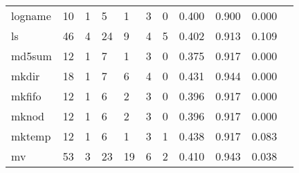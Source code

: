 \begin{longtable}{lp{1.10cm}p{1.10cm}p{1.10cm}p{1.10cm}p{1.10cm}p{1.10cm}p{1.10cm}p{1.10cm}p{1.10cm}p{1.10cm}}
logname   &                     10 &                                  1 &                                 5 &                                1 &                                 3 &                               0 &                          0.400 &                                 0.900 &                               0.000 \\
ls        &                     46 &                                  4 &                                24 &                                9 &                                 4 &                               5 &                          0.402 &                                 0.913 &                               0.109 \\
md5sum    &                     12 &                                  1 &                                 7 &                                1 &                                 3 &                               0 &                          0.375 &                                 0.917 &                               0.000 \\
mkdir     &                     18 &                                  1 &                                 7 &                                6 &                                 4 &                               0 &                          0.431 &                                 0.944 &                               0.000 \\
mkfifo    &                     12 &                                  1 &                                 6 &                                2 &                                 3 &                               0 &                          0.396 &                                 0.917 &                               0.000 \\
mknod     &                     12 &                                  1 &                                 6 &                                2 &                                 3 &                               0 &                          0.396 &                                 0.917 &                               0.000 \\
mktemp    &                     12 &                                  1 &                                 6 &                                1 &                                 3 &                               1 &                          0.438 &                                 0.917 &                               0.083 \\
mv        &                     53 &                                  3 &                                23 &                               19 &                                 6 &                               2 &                          0.410 &                                 0.943 &                               0.038 \\

\end{longtable}
